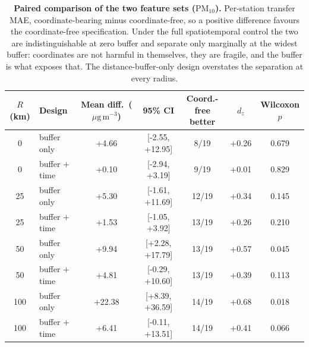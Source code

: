 \documentclass[11pt]{article}
\newcommand*{\ugm}{\ensuremath{\mu\mathrm{g\,m^{-3}}}}
\newcommand*{\pmten}{\ensuremath{\mathrm{PM_{10}}}}
\begin{document}
\begin{table}[htbp]\centering\footnotesize
\caption{\textbf{Paired comparison of the two feature sets (\pmten{}).} Per-station transfer MAE, coordinate-bearing minus coordinate-free, so a positive difference favours the coordinate-free specification. Under the full spatiotemporal control the two are indistinguishable at zero buffer and separate only marginally at the widest buffer: coordinates are not harmful in themselves, they are fragile, and the buffer is what exposes that. The distance-buffer-only design overstates the separation at every radius.}
\label{si:t22}
\begin{tabular}{clccccc}\toprule
$R$ (km) & Design & Mean diff.\ (\ugm) & 95\% CI & Coord.-free better & $d_z$ & Wilcoxon $p$ \\ \midrule
0 & buffer only & +4.66 & [-2.55, +12.95] & 8/19 & +0.26 & 0.679 \\
0 & buffer $+$ time & +0.10 & [-2.94, +3.19] & 9/19 & +0.01 & 0.829 \\
25 & buffer only & +5.30 & [-1.61, +11.69] & 12/19 & +0.34 & 0.145 \\
25 & buffer $+$ time & +1.53 & [-1.05, +3.92] & 13/19 & +0.26 & 0.210 \\
50 & buffer only & +9.94 & [+2.28, +17.79] & 13/19 & +0.57 & 0.045 \\
50 & buffer $+$ time & +4.81 & [-0.29, +10.60] & 13/19 & +0.39 & 0.113 \\
100 & buffer only & +22.38 & [+8.39, +36.59] & 14/19 & +0.68 & 0.018 \\
100 & buffer $+$ time & +6.41 & [-0.11, +13.51] & 14/19 & +0.41 & 0.066 \\
\bottomrule\end{tabular}\end{table}
\end{document}
